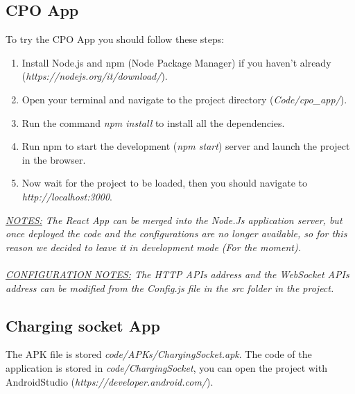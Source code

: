 \subsection{CPO App}
To try the CPO App you should follow these steps:
\begin{enumerate}
    \item Install Node.js and npm (Node Package Manager) if you haven't already \\(\emph{https://nodejs.org/it/download/}).
    \item  Open your terminal and navigate to the project directory (\emph{Code/cpo\_app/}).
    \item Run the command \emph{npm install} to install all the dependencies.
    \item Run npm to start the development (\emph{npm start}) server and launch the project in the browser.
    \item Now wait for the project to be loaded, then you should navigate to \emph{http://localhost:3000}.
\end{enumerate}
\emph{\underline{NOTES:} The React App can be merged into the Node.Js application server, but once deployed the code and the configurations are no longer available, so for this reason we decided to leave it in development mode (For the moment).}
\\\\\emph{\underline{CONFIGURATION NOTES:} The HTTP APIs address and the WebSocket APIs address can be modified from the Config.js file in the src folder in the project.}
\subsection{Charging socket App}
The APK file is stored \emph{code/APKs/ChargingSocket.apk}. The code of the application is stored in \emph{code/ChargingSocket}, you can open the project with AndroidStudio (\emph{https://developer.android.com/}).
